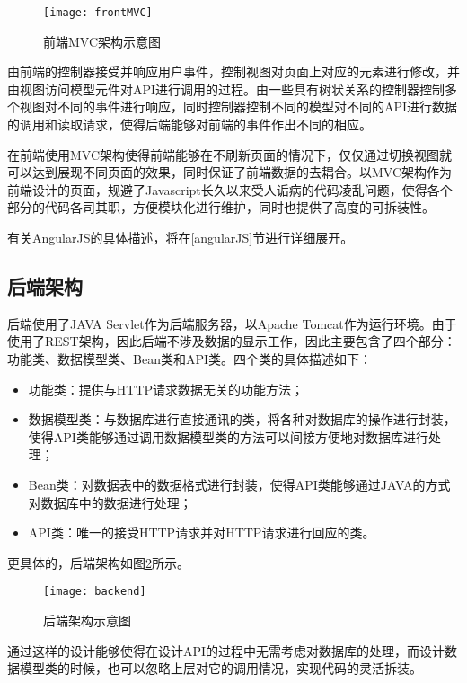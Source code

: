\begin{figure}[H]
  \centering
  \texttt{[image: frontMVC]}
  \caption{前端MVC架构示意图}
  \label{fig:frontMVC}
\end{figure}

由前端的控制器接受并响应用户事件，控制视图对页面上对应的元素进行修改，并由视图访问模型元件对API进行调用的过程。由一些具有树状关系的控制器控制多个视图对不同的事件进行响应，同时控制器控制不同的模型对不同的API进行数据的调用和读取请求，使得后端能够对前端的事件作出不同的相应。

在前端使用MVC架构使得前端能够在不刷新页面的情况下，仅仅通过切换视图就可以达到展现不同页面的效果，同时保证了前端数据的去耦合。以MVC架构作为前端设计的页面，规避了Javascript长久以来受人诟病的代码凌乱问题，使得各个部分的代码各司其职，方便模块化进行维护，同时也提供了高度的可拆装性。

有关AngularJS的具体描述，将在\ref{angularJS}节进行详细展开。

\subsection{后端架构}

后端使用了JAVA Servlet作为后端服务器，以Apache Tomcat作为运行环境。由于使用了REST架构，因此后端不涉及数据的显示工作，因此主要包含了四个部分：功能类、数据模型类、Bean类和API类。四个类的具体描述如下：

\begin{itemize}
	\item 功能类：提供与HTTP请求数据无关的功能方法；
	\item 数据模型类：与数据库进行直接通讯的类，将各种对数据库的操作进行封装，使得API类能够通过调用数据模型类的方法可以间接方便地对数据库进行处理；
	\item Bean类：对数据表中的数据格式进行封装，使得API类能够通过JAVA的方式对数据库中的数据进行处理；
	\item API类：唯一的接受HTTP请求并对HTTP请求进行回应的类。
\end{itemize}

更具体的，后端架构如图\ref{fig:backend}所示。

\begin{figure}[H]
  \centering
  \texttt{[image: backend]}
  \caption{后端架构示意图}
  \label{fig:backend}
\end{figure}

通过这样的设计能够使得在设计API的过程中无需考虑对数据库的处理，而设计数据模型类的时候，也可以忽略上层对它的调用情况，实现代码的灵活拆装。

